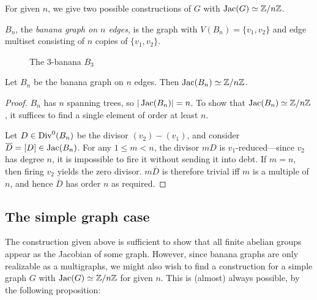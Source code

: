 \documentclass{amsart}
\begin{document}
For given $n$, we give two possible constructions of $G$ with $\operatorname{Jac}(G)
\simeq \mathbb{Z}/n\mathbb{Z}$.

\begin{defn}
  $B_n$, the \emph{banana graph on $n$ edges}, is the graph with
  $V(B_n) = \{v_1, v_2\}$ and edge multiset consisting of $n$ copies of
  $\{v_1, v_2\}$.
\end{defn}

\begin{figure}[h]
  \begin{center}
    \caption{The $3$-banana $B_3$}
  \end{center}
\end{figure}

\begin{prop}
  \label{prop:banana_cyclic}
  Let $B_n$ be the banana graph on $n$ edges. Then $\operatorname{Jac}(B_n) \simeq \mathbb{Z}/n\mathbb{Z}$.
\end{prop}

\begin{proof}
  $B_n$ has $n$ spanning trees, so
  $|\operatorname{Jac}(B_n)| = n$. To show that $\operatorname{Jac}(B_n) \simeq \mathbb{Z}/n\mathbb{Z}$, it
  suffices to find a single element of order at least $n$.

  Let $D \in \operatorname{Div}^0(B_n)$ be the divisor $(v_2) - (v_1)$, and consider
  $\overline{D} = [D] \in \operatorname{Jac}(B_n)$. For any $1 \le m < n$, the
  divisor $mD$ is $v_1$-reduced---since $v_2$ has degree $n$, it is
  impossible to fire it without sending it into debt. If $m=n$, then
  firing $v_2$ yields the zero divisor. $m\overline{D}$ is therefore
  trivial iff $m$ is a multiple of $n$, and hence $\overline{D}$ has
  order $n$ as required.
\end{proof}

\subsection{The simple graph case}
The construction given above is sufficient to show that all finite
abelian groups appear as the Jacobian of some graph. However, since
banana graphs are only realizable as a multigraphs, we might also wish
to find a construction for a simple graph $G$ with $\operatorname{Jac}(G) \simeq
\mathbb{Z}/n\mathbb{Z}$ for given $n$. This is (almost) always possible, by the
following proposition:
\end{document}
